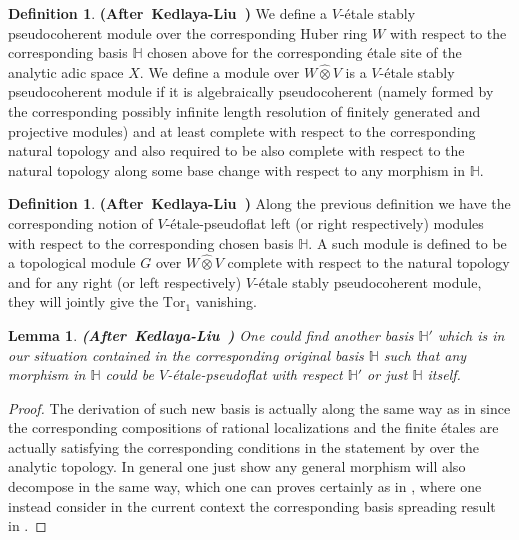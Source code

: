 \documentclass[12pt]{amsart}
\newtheorem{lemma}[theorem]{Lemma}
\theoremstyle{definition}
\newtheorem{definition}[theorem]{Definition}
\numberwithin{equation}{section}
\begin{document}
\begin{definition} \mbox{\bf{(After Kedlaya-Liu \cite[Definition 2.5.9]{KL2})}}
We define a $V$-\'etale stably pseudocoherent module over the corresponding Huber ring $W$ with respect to the corresponding basis $\mathbb{H}$ chosen above for the corresponding \'etale site of the analytic adic space $X$. We define a module over $W\widehat{\otimes}V$ is a $V$-\'etale stably pseudocoherent module if it is algebraically pseudocoherent (namely formed by the corresponding possibly infinite length resolution of finitely generated and projective modules) and at least complete with respect to the corresponding natural topology and also required to be also complete with respect to the natural topology along some base change with respect to any morphism in $\mathbb{H}$.
\end{definition}



\begin{definition} \mbox{\bf{(After Kedlaya-Liu \cite[Definition 2.5.9]{KL2})}}
Along the previous definition we have the corresponding notion of $V$-\'etale-pseudoflat left (or right respectively) modules with respect to the corresponding chosen basis $\mathbb{H}$. A such module is defined to be a topological module $G$ over $W\widehat{\otimes}V$ complete with respect to the natural topology and for any right (or left respectively) $V$-\'etale stably pseudocoherent module, they will jointly give the $\mathrm{Tor}_1$ vanishing.
\end{definition}


\begin{lemma}\mbox{\bf{(After Kedlaya-Liu \cite[Lemma 2.5.10]{KL2})}}
One could find another basis $\mathbb{H}'$ which is in our situation contained in the corresponding original basis $\mathbb{H}$ such that any morphism in $\mathbb{H}$ could be $V$-\'etale-pseudoflat with respect $\mathbb{H}'$ or just $\mathbb{H}$ itself.	
\end{lemma}


\begin{proof}
The derivation of such new basis is actually along the same way as in \cite[Lemma 2.5.10]{KL2} since the corresponding compositions of rational localizations and the finite \'etales are actually satisfying the corresponding conditions in the statement by \cite[Theorem 2.12]{TX2} over the analytic topology. In general one just show any general morphism will also decompose in the same way, which one can proves certainly as in \cite[Lemma 2.5.10]{KL2}, where one instead consider in the current context the corresponding basis spreading result in \cite[Lemma 1.10.4]{Ked1}. 
\end{proof}
\end{document}
